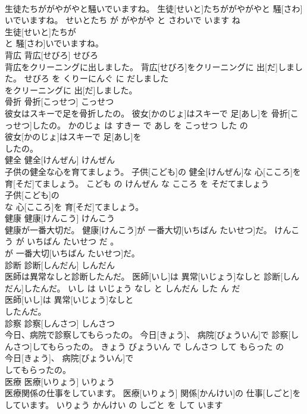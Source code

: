 \documentclass[8pt]{extreport}
\begin{document}
\begin{CJK}{UTF8}{min}
\\	生徒たちががやがやと騒いでいますね。	生徒[せいと]たちががやがやと 騒[さわ]いでいますね。	せいとたち が がやがや と さわいで います ね	
\\	生徒[せいと]たちが
\\	と 騒[さわ]いでいますね。			
\\	背広	背広[せびろ]	せびろ	
\\	背広をクリーニングに出しました。	背広[せびろ]をクリーニングに 出[だ]しました。	せびろ を くりーにんぐ に だしました	
\\	をクリーニングに 出[だ]しました。			
\\	骨折	骨折[こっせつ]	こっせつ	
\\	彼女はスキーで足を骨折したの。	彼女[かのじょ]はスキーで 足[あし]を 骨折[こっせつ]したの。	かのじょ は すきー で あし を こっせつ した の	
\\	彼女[かのじょ]はスキーで 足[あし]を
\\	したの。			
\\	健全	健全[けんぜん]	けんぜん	
\\	子供の健全な心を育てましょう。	子供[こども]の 健全[けんぜん]な 心[こころ]を 育[そだ]てましょう。	こども の けんぜん な こころ を そだてましょう	
\\	子供[こども]の
\\	な 心[こころ]を 育[そだ]てましょう。			
\\	健康	健康[けんこう]	けんこう	
\\	健康が一番大切だ。	健康[けんこう]が 一番大切[いちばん たいせつ]だ。	けんこう が いちばん たいせつ だ 。	
\\	が 一番大切[いちばん たいせつ]だ。			
\\	診断	診断[しんだん]	しんだん	
\\	医師は異常なしと診断したんだ。	医師[いし]は 異常[いじょう]なしと 診断[しんだん]したんだ。	いし は いじょう なし と しんだん した ん だ	
\\	医師[いし]は 異常[いじょう]なしと
\\	したんだ。			
\\	診察	診察[しんさつ]	しんさつ	
\\	今日、病院で診察してもらったの。	今日[きょう]、 病院[びょういん]で 診察[しんさつ]してもらったの。	きょう びょういん で しんさつ して もらった の	
\\	今日[きょう]、 病院[びょういん]で
\\	してもらったの。			
\\	医療	医療[いりょう]	いりょう	
\\	医療関係の仕事をしています。	医療[いりょう] 関係[かんけい]の 仕事[しごと]をしています。	いりょう かんけい の しごと を して います	

\end{CJK}
\end{document}
